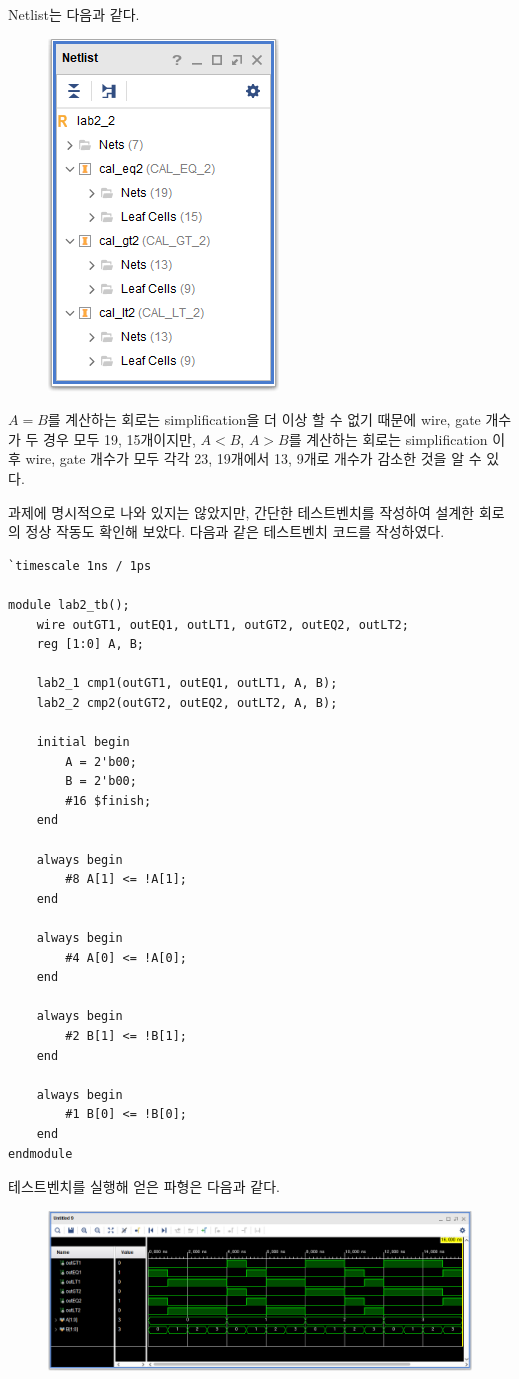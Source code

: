 \documentclass{scrartcl}
\begin{document}
Netlist는 다음과 같다.
\begin{figure}[H]
  \centering
  \includegraphics[width=0.4\linewidth]{lab2_2_netlist}
\end{figure}

\(A = B\)를 계산하는 회로는 simplification을 더 이상 할 수 없기 때문에 wire, gate 개수가 두 경우 모두 19, 15개이지만, \(A < B\), \(A > B\)를 계산하는 회로는 simplification 이후 wire, gate 개수가 모두 각각 23, 19개에서 13, 9개로 개수가 감소한 것을 알 수 있다.

과제에 명시적으로 나와 있지는 않았지만, 간단한 테스트벤치를 작성하여 설계한 회로의 정상 작동도 확인해 보았다. 다음과 같은 테스트벤치 코드를 작성하였다.
\lstset{language=Verilog}
\begin{lstlisting}
`timescale 1ns / 1ps

module lab2_tb();
    wire outGT1, outEQ1, outLT1, outGT2, outEQ2, outLT2;
    reg [1:0] A, B;

    lab2_1 cmp1(outGT1, outEQ1, outLT1, A, B);
    lab2_2 cmp2(outGT2, outEQ2, outLT2, A, B);

    initial begin
        A = 2'b00;
        B = 2'b00;
        #16 $finish;
    end

    always begin
        #8 A[1] <= !A[1];
    end

    always begin
        #4 A[0] <= !A[0];
    end

    always begin
        #2 B[1] <= !B[1];
    end

    always begin
        #1 B[0] <= !B[0];
    end
endmodule
\end{lstlisting}

테스트벤치를 실행해 얻은 파형은 다음과 같다.
\begin{figure}[H]
  \centering
  \includegraphics[width=\linewidth]{lab2_waveform}
\end{figure}
\end{document}

